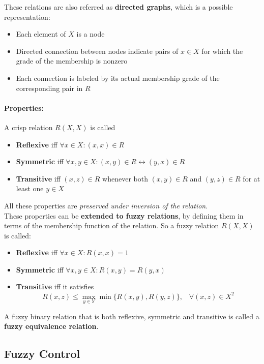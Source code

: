 These relations are also referred as \textbf{directed graphs}, which is a possible representation: 
\begin{itemize}
	\item Each element of $X$ is a node
	\item Directed connection between nodes indicate pairs of $x \in X$ for which the grade of the membership is nonzero 
	\item Each connection is labeled by its actual membership grade of the corresponding pair in $R$
\end{itemize}

\paragraph{Properties:} A crisp relation $R(X,X)$ is called 
\begin{itemize}
	\item \textbf{Reflexive} iff $\forall x \in X: (x,x) \in R$
	\item \textbf{Symmetric} iff $\forall x, y \in X: (x,y) \in R \leftrightarrow (y,x) \in R$
	\item \textbf{Transitive} iff $(x,z) \in R$ whenever both $(x,y) \in R$ and $(y,z) \in R$ for at least one $y \in X$
\end{itemize}
All these properties are \textit{preserved under inversion of the relation}.\\

These properties can be \textbf{extended to fuzzy relations}, by defining them in terms of the membership function of the relation. So a fuzzy relation $R(X,X)$ is called: 
\begin{itemize}
	\item \textbf{Reflexive} iff $\forall x \in X: R(x,x) = 1$
	\item \textbf{Symmetric} iff $\forall x,y \in X: R(x,y) = R(y,x)$
	\item \textbf{Transitive} iff it satisfies
	$$ R(x,z) \leq \max_{y \in Y} \min \{R(x,y), R(y,z)\}, \;\;\; \forall (x,z) \in X^2 $$
\end{itemize}

A fuzzy binary relation that is both reflexive, symmetric and transitive is called a \textbf{fuzzy equivalence relation}.\\

\newpage

\subsection{Fuzzy Control}

